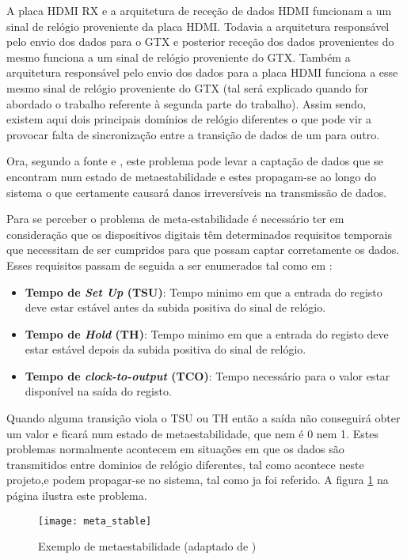 A placa HDMI RX e a arquitetura de receção de dados HDMI funcionam a um sinal de relógio proveniente da placa HDMI. Todavia a arquitetura responsável pelo envio dos dados para o GTX e posterior receção dos dados provenientes do mesmo funciona a um sinal de relógio proveniente do GTX. Também a arquitetura responsável pelo envio dos dados para a placa HDMI funciona a esse mesmo sinal de relógio proveniente do GTX (tal será explicado quando for abordado o trabalho referente à segunda parte do trabalho). Assim sendo, existem aqui dois principais domínios de relógio diferentes o que pode vir a provocar falta de sincronização entre a transição de dados de um para outro.


Ora, segundo a fonte \cite{R024} e \cite{R037}, este problema pode levar a captação de dados que se encontram num estado de metaestabilidade e estes propagam-se ao longo do sistema o que certamente causará danos irreversíveis na transmissão de dados. 

Para se perceber o problema de meta-estabilidade é necessário ter em consideração que os dispositivos digitais têm determinados requisitos temporais que necessitam de ser cumpridos para que possam captar corretamente os dados. Esses requisitos passam de seguida a ser enumerados tal como em \cite{R037}:

\begin{itemize}
	\item \textbf{Tempo de \textit{Set Up} (T{\tiny SU})}: Tempo minimo em que a entrada do registo deve estar estável antes da subida positiva do sinal de relógio.
	\item \textbf{Tempo de \textit{Hold} (T{\tiny H})}: Tempo minimo em que a entrada do registo deve estar estável depois da subida positiva do sinal de relógio.
	\item \textbf{Tempo de \textit{clock-to-output} (T{\tiny CO})}: Tempo necessário para o valor estar disponível na saída do registo.
\end{itemize}
 
Quando alguma transição viola o T{\tiny SU} ou T{\tiny H} então a saída não conseguirá obter um valor e ficará num estado de metaestabilidade, que nem é 0 nem 1. Estes problemas normalmente acontecem em situações em que os dados são transmitidos entre dominios de relógio diferentes, tal como acontece neste projeto,e podem propagar-se no sistema, tal como ja foi referido. A figura \ref{fig:metaestabilidade} na página \pageref{fig:metaestabilidade} ilustra este problema.

\begin{figure}[h!]
	\begin{center}
		\leavevmode
		\texttt{[image: meta\_stable]}
		\caption[Exemplo de metaestabilidade]{Exemplo de metaestabilidade (adaptado de \cite{R037})}
		\label{fig:metaestabilidade}
	\end{center}
\end{figure}

